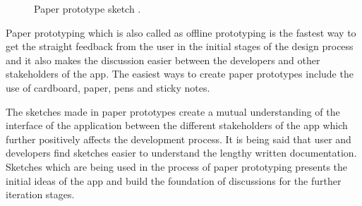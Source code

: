 \begin{figure}[hbt!] 
  \centering
  \qquad
  \caption[Paper prototype sketch ]{Paper prototype sketch .}
  \label{fig:Paper_proto}
\end{figure}
Paper prototyping which is also called as offline prototyping is the fastest way to get the straight feedback from the user in the initial stages of the design process and it also makes the discussion easier between the developers and other stakeholders of the app. The easiest ways to create paper prototypes include the use of cardboard, paper, pens and sticky notes.\citep{Bansemir2014ExperienceVisualizations}

The sketches made in paper prototypes create a mutual understanding of the interface of the application between the different stakeholders of the app which further positively affects the development process. It is being said that user and developers find sketches easier to understand the lengthy written documentation. Sketches which are being used in the process of paper prototyping presents the initial ideas of the app and build the foundation of discussions for the further iteration stages\citep{Bansemir2014ExperienceVisualizations}.

